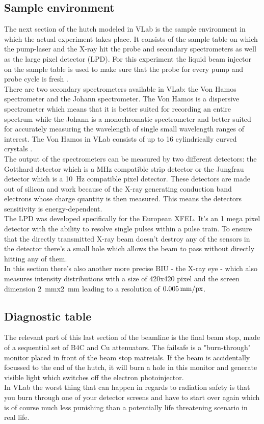 \documentclass[10pt,a4paper, bibliography=totoc]{scrartcl}
\begin{document}
\subsection{Sample environment}
The next section of the hutch modeled in VLab is the sample environment in which the actual experiment takes place. It consists of the sample table on which the pump-laser and the X-ray hit the probe and secondary spectrometers as well as the large pixel detector (LPD). For this experiment the liquid beam injector on the sample table is used to make sure that the probe for every pump and probe cycle is fresh \cite{0}.\\
There are two secondary spectrometers available in VLab: the Von Hamos spectrometer and the Johann spectrometer. The Von Hamos is a dispersive spectrometer which means that it is better suited for recording an entire spectrum while the Johann is a monochromatic spectrometer and better suited for accurately measuring the wavelength of single small wavelength ranges of interest. The Von Hamos in VLab consists of up to 16 cylindrically curved crystals \cite{0}.\\
The output of the spectrometers can be measured by two different detectors: the Gotthard detector which is a \unit{MHz} compatible strip detector or the Jungfrau detector which is a \qty{10}{Hz} compatible pixel detector. These detectors are made out of silicon and work because of the X-ray generating conduction band electrons whose charge quantity is then measured. This means the detectors sensitivity is energy-dependent.\\
The LPD was developed specifically for the European XFEL. It's an 1 mega pixel detector with the ability to resolve single pulses within a pulse train. To ensure that the directly transmitted X-ray beam doesn't destroy any of the sensors in the detector there's a small hole which allows the beam to pass without directly hitting any of them.\\
In this section there's also another more precise BIU - the X-ray eye - which also measures intensity distributions with a size of 420x420 pixel and the screen dimension \qty{2}{mm}x\qty{2}{mm} leading to a resolution of $0.005\text{\,mm/px}$.

\subsection{Diagnostic table}
The relevant part of this last section of the beamline is the final beam stop, made of a sequential set of B4C and Cu attenuators. The failsafe is a "burn-through" monitor placed in front of the beam stop matreials. If the beam is accidentally focussed to the end of the hutch, it will burn a hole in this monitor and generate visible light which switches off the electron photoinjector.\\
In VLab the worst thing that can happen in regards to radiation safety is that you burn through one of your detector screens and have to start over again which is of course much less punishing than a potentially life threatening scenario in real life.
\end{document}
